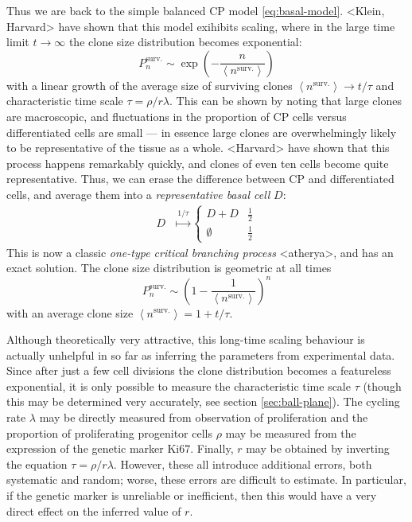 \documentclass[10pt,UKenglish]{article}
\begin{document}
Thus we are back to the simple balanced CP model \ref{eq:basal-model}. <Klein,
Harvard> have shown that this model exihibits scaling, where in the large time
limit $t\rightarrow\infty$ the clone size distribution becomes exponential:
$$P^\textrm{surv.}_n \sim \exp\left(-\frac{n}{\left\langle n^\textrm{surv.}
\right\rangle}\right)$$ with a linear growth of the average size of surviving
clones $\left\langle n^\textrm{surv.} \right\rangle \rightarrow t/\tau$ and
characteristic time scale $\tau = \rho/r\lambda$. This can be shown by noting
that large clones are macroscopic, and fluctuations in the proportion of CP
cells versus differentiated cells are small --- in essence large clones are
overwhelmingly likely to be representative of the tissue as a whole. <Harvard>
have shown that this process happens remarkably quickly, and clones of even ten
cells become quite representative. Thus, we can erase the difference between CP
and differentiated cells, and average them into a \emph{representative basal
cell} $D$: 
\begin{align}
D &\overset{1/\tau}{\longmapsto} \begin{cases}
D+D & \frac{1}{2} \\
\emptyset & \frac{1}{2}\end{cases}\label{eq:simple-balanced-model}
\end{align}
This is now a classic \emph{one-type critical branching process} <atherya>, and
has an exact solution. The clone size distribution is geometric at all times
$$P^\textrm{surv.}_n \sim \left(1-\frac{1}{\left\langle n^\textrm{surv.}
\right\rangle}\right)^n$$ with an average clone size $\left\langle
n^\textrm{surv.} \right\rangle = 1 + t/\tau$.

Although theoretically very attractive, this long-time scaling behaviour is
actually unhelpful in so far as inferring the parameters from experimental data.
Since after just a few cell divisions the clone distribution becomes a
featureless exponential, it is only possible to measure the characteristic time
scale $\tau$ (though this may be determined very accurately, see section
\ref{sec:ball-plane}). The cycling rate $\lambda$ may be directly measured from
observation of proliferation and the proportion of proliferating progenitor
cells $\rho$ may be measured from the expression of the genetic marker Ki67.
Finally, $r$ may be obtained by inverting the equation $\tau = \rho/r\lambda$.
However, these all introduce additional errors, both systematic and random;
worse, these errors are difficult to estimate. In particular, if the genetic
marker is unreliable or inefficient, then this would have a very direct effect
on the inferred value of $r$.
\end{document}
